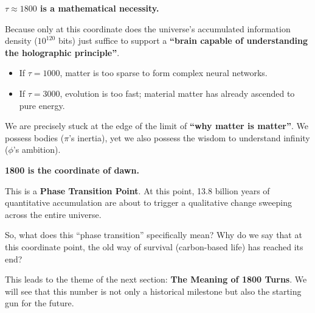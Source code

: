 \textbf{$\tau \approx 1800$ is a mathematical necessity.}

Because only at this coordinate does the universe's accumulated information density ($10^{120}$ bits) just suffice to support a \textbf{``brain capable of understanding the holographic principle''}.

\begin{itemize}
\item If $\tau = 1000$, matter is too sparse to form complex neural networks.

\item If $\tau = 3000$, evolution is too fast; material matter has already ascended to pure energy.
\end{itemize}

We are precisely stuck at the edge of the limit of \textbf{``why matter is matter''}. We possess bodies ($\pi$'s inertia), yet we also possess the wisdom to understand infinity ($\phi$'s ambition).

\textbf{1800 is the coordinate of dawn.}

This is a \textbf{Phase Transition Point}. At this point, 13.8 billion years of quantitative accumulation are about to trigger a qualitative change sweeping across the entire universe.

So, what does this ``phase transition'' specifically mean? Why do we say that at this coordinate point, the old way of survival (carbon-based life) has reached its end?

This leads to the theme of the next section: \textbf{The Meaning of 1800 Turns}. We will see that this number is not only a historical milestone but also the starting gun for the future.

